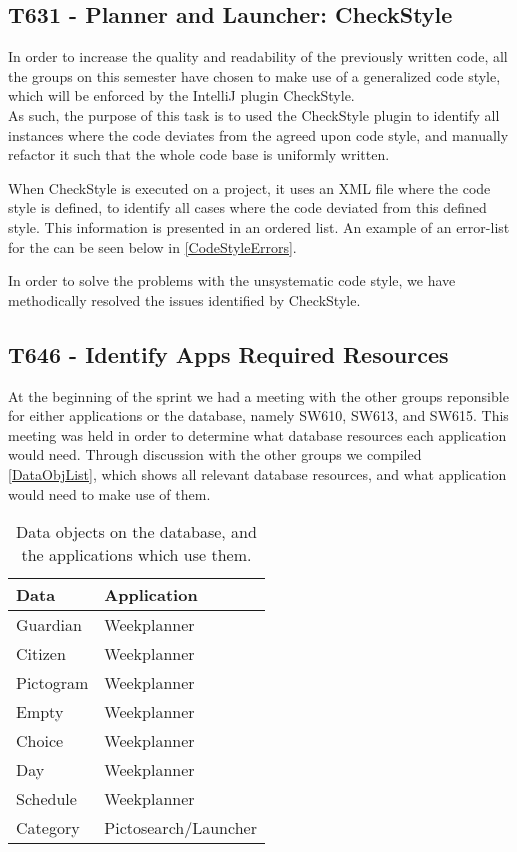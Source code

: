 \subsection{T631 - Planner and Launcher: CheckStyle}
In order to increase the quality and readability of the previously written code,
all the groups on this semester have chosen to make use of a generalized code
style, which will be enforced by the IntelliJ plugin CheckStyle.\\
As such, the purpose of this task is to used the CheckStyle plugin to identify
all instances where the code deviates from the agreed upon code style, and
manually refactor it such that the whole code base is uniformly written.\nl

When CheckStyle is executed on a project, it uses an XML file where the code
style is defined, to identify all cases where the code deviated from this
defined style. This information is presented in an ordered list. An example of
an error-list for the  can be seen below in
\autoref{CodeStyleErrors}.


In order to solve the problems with the unsystematic code style, we have
methodically resolved the issues identified by CheckStyle.

\subsection{T646 - Identify Apps Required Resources}\label{ReqResources}
At the beginning of the sprint we had a meeting with the other groups
reponsible for either applications or the database, namely SW610, SW613, and
SW615. This meeting was held in order to determine what database resources each
application would need. Through discussion with the other groups we compiled
\autoref{DataObjList}, which shows all relevant database resources, and what
application would need to make use of them. 

\begin{table}[H]
\centering
\begin{tabular}{|l|l|}
\hline
\textbf{Data}	& \textbf{Application}	\\\hline
Guardian		& Weekplanner 			\\\hline
Citizen    	   	& Weekplanner 			\\\hline 
Pictogram 		& Weekplanner 			\\\hline 
Empty    	   	& Weekplanner 			\\\hline
Choice   	   	& Weekplanner  			\\\hline
Day   	   		& Weekplanner 			\\\hline
Schedule  	   	& Weekplanner			\\\hline
Category       	& Pictosearch/Launcher	\\\hline
\end{tabular}
\caption{Data objects on the database, and the applications which use them.} 
\label{DataObjList}    
\end{table}

